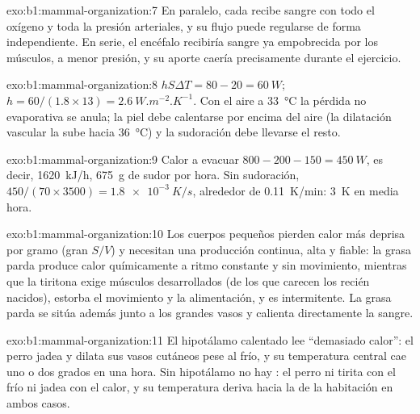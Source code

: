 \begin{solution}{exo:b1:mammal-organization:7}
En paralelo, cada  recibe sangre con todo el oxígeno y toda la presión
arteriales, y su flujo puede regularse de forma independiente. En serie, el
encéfalo recibiría sangre ya empobrecida por los músculos, a menor presión,
y su aporte caería precisamente durante el ejercicio.
\end{solution}

\begin{solution}{exo:b1:mammal-organization:8}
$hS\Delta T = 80 - 20 = \qty{60}{W}$; $h = 60/(1.8\times 13) =
\qty{2.6}{W.m^{-2}.K^{-1}}$. Con el aire a \qty{33}{\celsius} la pérdida no
evaporativa se anula; la piel debe calentarse por encima del aire (la
dilatación vascular la sube hacia \qty{36}{\celsius}) y la sudoración debe
llevarse el resto.
\end{solution}

\begin{solution}{exo:b1:mammal-organization:9}
Calor a evacuar $800 - 200 - 150 = \qty{450}{W}$, es decir, \qty{1620}{kJ/h},
\qty{675}{g} de sudor por hora. Sin sudoración, $450/(70\times 3500) =
\qty{1.8e-3}{K/s}$, alrededor de \qty{0.11}{K/min}: \qty{3}{K} en media hora.
\end{solution}

\begin{solution}{exo:b1:mammal-organization:10}
Los cuerpos pequeños pierden calor más deprisa por gramo (gran $S/V$) y
necesitan una producción continua, alta y fiable: la grasa parda produce
calor químicamente a ritmo constante y sin movimiento, mientras que la
tiritona exige músculos desarrollados (de los que carecen los recién
nacidos), estorba el movimiento y la alimentación, y es intermitente. La
grasa parda se sitúa además junto a los grandes vasos y calienta
directamente la sangre.
\end{solution}

\begin{solution}{exo:b1:mammal-organization:11}
El hipotálamo calentado lee ``demasiado calor'': el perro jadea y dilata sus
vasos cutáneos pese al frío, y su temperatura central cae uno o dos grados
en una hora. Sin hipotálamo no hay : el perro ni tirita con
el frío ni jadea con el calor, y su temperatura deriva hacia la de la
habitación en ambos casos.
\end{solution}

